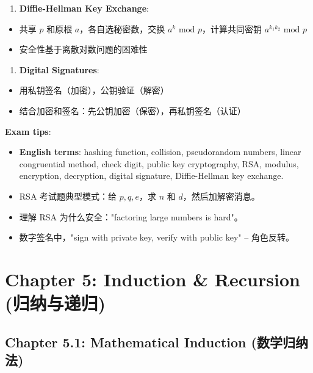 \documentclass[10pt,a4paper,openany]{ctexbook}
\theoremstyle{definition}
\theoremstyle{remark}
\begin{document}
\begin{enumerate}
\item \textbf{Diffie-Hellman Key Exchange}:
\end{enumerate}

\begin{itemize}
\item 共享 $p$ 和原根 $a$，各自选秘密数，交换 $a^k \text{ mod } p$，计算共同密钥 $a^{k_1 k_2} \text{ mod } p$
\item 安全性基于离散对数问题的困难性

\end{itemize}

\begin{enumerate}
\item \textbf{Digital Signatures}:
\end{enumerate}

\begin{itemize}
\item 用私钥签名（加密），公钥验证（解密）
\item 结合加密和签名：先公钥加密（保密），再私钥签名（认证）

\end{itemize}

\textbf{Exam tips}:
\begin{itemize}
\item \textbf{English terms}: hashing function, collision, pseudorandom numbers, linear congruential method, check digit, public key cryptography, RSA, modulus, encryption, decryption, digital signature, Diffie-Hellman key exchange.
\item RSA 考试题典型模式：给 $p, q, e$，求 $n$ 和 $d$，然后加解密消息。
\item 理解 RSA 为什么安全："factoring large numbers is hard"。
\item 数字签名中，"sign with private key, verify with public key" -- 角色反转。

\end{itemize}

\chapter{Chapter 5: Induction \& Recursion (归纳与递归)}

\section{Chapter 5.1: Mathematical Induction (数学归纳法)}
\end{document}
